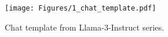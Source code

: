 \begin{figure}[t]
  \centering
  \texttt{[image: Figures/1\_chat\_template.pdf]}
  \caption{Chat template from Llama-3-Instruct series.}
  \vspace{-0.7em}
  \label{fig:chat_template}
\end{figure}
